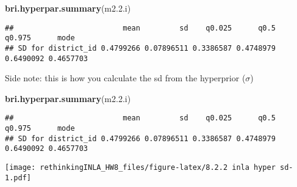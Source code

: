 \documentclass[
]{article}
\newenvironment{Shaded}{\begin{snugshade}}{\end{snugshade}}
\newcommand{\CommentTok}[1]{\textcolor[rgb]{0.56,0.35,0.01}{\textit{#1}}}
\newcommand{\ControlFlowTok}[1]{\textcolor[rgb]{0.13,0.29,0.53}{\textbf{#1}}}
\newcommand{\DecValTok}[1]{\textcolor[rgb]{0.00,0.00,0.81}{#1}}
\newcommand{\FloatTok}[1]{\textcolor[rgb]{0.00,0.00,0.81}{#1}}
\newcommand{\KeywordTok}[1]{\textcolor[rgb]{0.13,0.29,0.53}{\textbf{#1}}}
\newcommand{\NormalTok}[1]{#1}
\newcommand{\OperatorTok}[1]{\textcolor[rgb]{0.81,0.36,0.00}{\textbf{#1}}}
\newcommand{\StringTok}[1]{\textcolor[rgb]{0.31,0.60,0.02}{#1}}
\begin{document}
\begin{Shaded}
\begin{Highlighting}[]
\KeywordTok{bri.hyperpar.summary}\NormalTok{(m2.}\FloatTok{2.}\NormalTok{i)}
\end{Highlighting}
\end{Shaded}

\begin{verbatim}
##                         mean         sd    q0.025      q0.5    q0.975      mode
## SD for district_id 0.4799266 0.07896511 0.3386587 0.4748979 0.6490092 0.4657703
\end{verbatim}

Side note: this is how you calculate the sd from the hyperprior
(\(\sigma\))

\begin{Shaded}
\begin{Highlighting}[]
\KeywordTok{bri.hyperpar.summary}\NormalTok{(m2.}\FloatTok{2.}\NormalTok{i)}
\end{Highlighting}
\end{Shaded}

\begin{verbatim}
##                         mean         sd    q0.025      q0.5    q0.975      mode
## SD for district_id 0.4799266 0.07896511 0.3386587 0.4748979 0.6490092 0.4657703
\end{verbatim}

\begin{Shaded}
\end{Shaded}

\texttt{[image: rethinkingINLA\_HW8\_files/figure-latex/8.2.2 inla hyper sd-1.pdf]}
\end{document}
